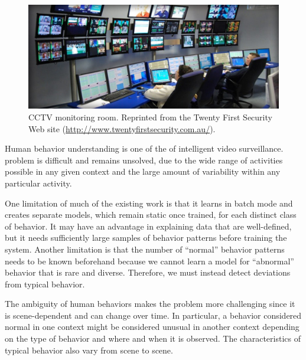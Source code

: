 \begin{figure}[t]
    \centering
    \includegraphics[width=5in]{figures/monitoring}
    \caption[CCTV monitoring room.]{\small CCTV monitoring
        room. Reprinted from the Twenty First Security Web site
        (\url{http://www.twentyfirstsecurity.com.au/}).}
    \label{fig:monitoring}
\end{figure}

Human behavior understanding is one of the \DIFdelbegin {}\DIFdelend \DIFaddbegin {}\DIFaddend of
intelligent video surveillance. 
\DIFdelbegin {}\DIFdelend \DIFaddbegin {}\DIFaddend problem is difficult and
remains unsolved, due to the wide range of activities possible in any
given context and the large amount of variability within any
particular activity.

One limitation of much of the existing work is that it learns in batch
mode and creates separate models, which remain static once trained,
for each distinct class of behavior. It may have an advantage in
explaining data that are well-defined, but it needs sufficiently large
samples of behavior patterns before training the system. Another
limitation is that the number of ``normal'' behavior patterns needs to
be known beforehand because we cannot learn a model for ``abnormal''
behavior that is rare and diverse. Therefore, we must instead detect
deviations from typical behavior.

The ambiguity of human behaviors makes the problem more challenging
since it is scene-dependent and can change over time. In particular, a
behavior considered normal in one context might be considered unusual
in another context depending on the type of behavior and where and
when it is observed. The characteristics of typical behavior also vary
from scene to scene.

